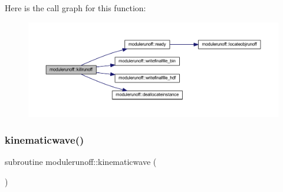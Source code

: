 Here is the call graph for this function\+:\nopagebreak
\begin{figure}[H]
\begin{center}
\leavevmode
\includegraphics[width=350pt]{namespacemodulerunoff_aa17d0391187f304ab3410eb5d26a4711_cgraph}
\end{center}
\end{figure}
\mbox{\label{namespacemodulerunoff_ac9ce40d4e0d4a7a1faa6f0a7fd6eca2f}} 
\subsubsection{\texorpdfstring{kinematicwave()}{kinematicwave()}}
{\footnotesize\ttfamily subroutine modulerunoff\+::kinematicwave (\begin{DoxyParamCaption}{ }\end{DoxyParamCaption})\hspace{0.3cm}{\ttfamily [private]}}

